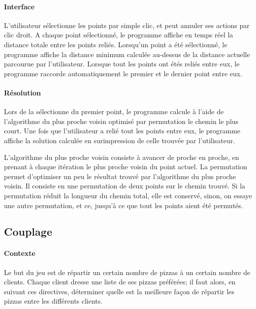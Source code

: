         \paragraph{Interface}
            L'utilisateur sélectionne les points par simple clic,
            et peut annuler ses actions par clic droit.
            A chaque point sélectionné, le programme
            affiche en temps réel la distance totale entre
            les points reliés.
            Lorsqu'un point a été sélectionné, le programme
            affiche la distance minimum calculée au-dessus de
            la distance actuelle parcourue par l'utilisateur.
            Lorsque tout les points ont étés reliés entre eux,
            le programme raccorde automatiquement le premier
            et le dernier point entre eux.
        \paragraph{Résolution}
            Lors de la sélectionne du premier point,
            le programme calcule à l'aide de l'algorithme
            du plus proche voisin optimisé par permutation
            le chemin le plus court.
            Une fois que l'utilisateur a relié tout les points
            entre eux, le programme affiche la solution calculée
            en surimpression de celle trouvée par l'utilisateur.

            L'algorithme du plus proche voisin consiste à avancer
            de proche en proche, en prenant à chaque itération le plus
            proche voisin du point actuel.
            La permutation permet d'optimiser un peu le résultat trouvé
            par l'algorithme du plus proche voisin.
            Il consiste en une permutation de deux points sur le chemin trouvé.
            Si la permutation réduit la longueur du chemin total,
            elle est conservé, sinon, on essaye une autre permutation,
            et ce, jusqu'à ce que tout les points aient été permutés.

	\subsection{Couplage}
		\paragraph{Contexte}
			Le but du jeu est de répartir un certain nombre de pizzas à un certain nombre de
			 clients. Chaque client dresse une liste de ses pizzas préférées; il faut alors,
			 en suivant ces directives, déterminer quelle est la meilleure façon de répartir
			 les pizzas entre les différents clients.

